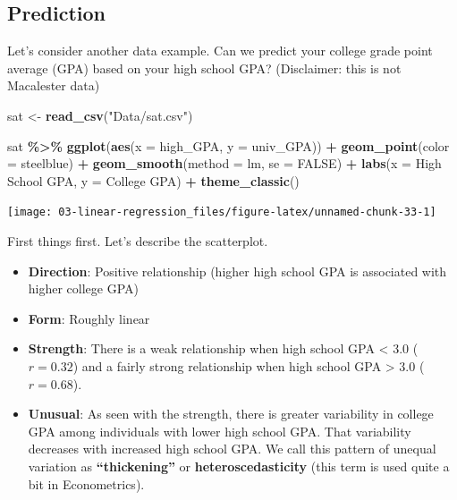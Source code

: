 \documentclass[
]{book}
\newenvironment{Shaded}{\begin{snugshade}}{\end{snugshade}}
\newcommand{\AttributeTok}[1]{\textcolor[rgb]{0.13,0.29,0.53}{#1}}
\newcommand{\ConstantTok}[1]{\textcolor[rgb]{0.56,0.35,0.01}{#1}}
\newcommand{\FunctionTok}[1]{\textcolor[rgb]{0.13,0.29,0.53}{\textbf{#1}}}
\newcommand{\NormalTok}[1]{#1}
\newcommand{\OtherTok}[1]{\textcolor[rgb]{0.56,0.35,0.01}{#1}}
\newcommand{\SpecialCharTok}[1]{\textcolor[rgb]{0.81,0.36,0.00}{\textbf{#1}}}
\newcommand{\StringTok}[1]{\textcolor[rgb]{0.31,0.60,0.02}{#1}}
\providecommand{\tightlist}{%
  \setlength{\itemsep}{0pt}\setlength{\parskip}{0pt}}
\begin{document}
\subsection{Prediction}\label{prediction}

Let's consider another data example. Can we predict your college grade point average (GPA) based on your high school GPA? (Disclaimer: this is not Macalester data)

\begin{Shaded}
\begin{Highlighting}[]
\NormalTok{sat }\OtherTok{\textless{}{-}} \FunctionTok{read\_csv}\NormalTok{(}\StringTok{"Data/sat.csv"}\NormalTok{)}
\end{Highlighting}
\end{Shaded}

\begin{Shaded}
\begin{Highlighting}[]
\NormalTok{sat }\SpecialCharTok{\%\textgreater{}\%}
    \FunctionTok{ggplot}\NormalTok{(}\FunctionTok{aes}\NormalTok{(}\AttributeTok{x =}\NormalTok{ high\_GPA, }\AttributeTok{y =}\NormalTok{ univ\_GPA)) }\SpecialCharTok{+}
    \FunctionTok{geom\_point}\NormalTok{(}\AttributeTok{color =} \StringTok{\textquotesingle{}steelblue\textquotesingle{}}\NormalTok{) }\SpecialCharTok{+}
    \FunctionTok{geom\_smooth}\NormalTok{(}\AttributeTok{method =} \StringTok{\textquotesingle{}lm\textquotesingle{}}\NormalTok{, }\AttributeTok{se =} \ConstantTok{FALSE}\NormalTok{) }\SpecialCharTok{+}
    \FunctionTok{labs}\NormalTok{(}\AttributeTok{x =} \StringTok{\textquotesingle{}High School GPA\textquotesingle{}}\NormalTok{, }\AttributeTok{y =} \StringTok{\textquotesingle{}College GPA\textquotesingle{}}\NormalTok{) }\SpecialCharTok{+} 
    \FunctionTok{theme\_classic}\NormalTok{()}
\end{Highlighting}
\end{Shaded}

\begin{center}\texttt{[image: 03-linear-regression\_files/figure-latex/unnamed-chunk-33-1]} \end{center}

First things first. Let's describe the scatterplot.

\begin{itemize}
\tightlist
\item
  \textbf{Direction}: Positive relationship (higher high school GPA is associated with higher college GPA)
\item
  \textbf{Form}: Roughly linear
\item
  \textbf{Strength}: There is a weak relationship when high school GPA \textless{} 3.0 (\(r = 0.32\)) and a fairly strong relationship when high school GPA \textgreater{} 3.0 (\(r = 0.68\)).
\item
  \textbf{Unusual}: As seen with the strength, there is greater variability in college GPA among individuals with lower high school GPA. That variability decreases with increased high school GPA. We call this pattern of unequal variation as \textbf{``thickening''} or \textbf{heteroscedasticity} (this term is used quite a bit in Econometrics).
\end{itemize}
\end{document}
